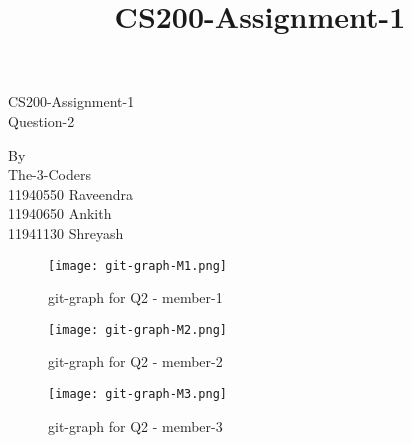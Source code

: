 \documentclass[a4paper]{article}
\begin{document}
 
	\title{CS200-Assignment-1} \centering
	\Huge
	CS200-Assignment-1\\
	Question-2 \\ \vspace{2cm}
	\huge
	
	By \\
	The-3-Coders    \\ \vspace{0.5cm}
	\Large
	11940550 Raveendra\\
	11940650 Ankith\\
	11941130 Shreyash \\                 
 
\begin{figure}
	\centering
	\texttt{[image: git-graph-M1.png]}
	\caption{git-graph for Q2 - member-1} 
	
\end{figure}
\begin{figure}
	\centering
	\texttt{[image: git-graph-M2.png]}
	\caption{git-graph for Q2 - member-2} 
	
\end{figure}
\begin{figure}
	\centering
	\texttt{[image: git-graph-M3.png]}
	\caption{git-graph for Q2 - member-3} 
	
\end{figure}


 
\end{document}
